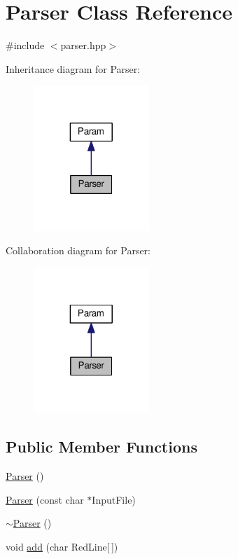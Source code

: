 \hypertarget{classParser}{\section{Parser Class Reference}
\label{classParser}
}


{\ttfamily \#include $<$parser.\-hpp$>$}



Inheritance diagram for Parser\-:
\nopagebreak
\begin{figure}[H]
\begin{center}
\leavevmode
\includegraphics[width=124pt]{classParser__inherit__graph}
\end{center}
\end{figure}


Collaboration diagram for Parser\-:
\nopagebreak
\begin{figure}[H]
\begin{center}
\leavevmode
\includegraphics[width=124pt]{classParser__coll__graph}
\end{center}
\end{figure}
\subsection*{Public Member Functions}
\begin{DoxyCompactItemize}
\item 
\hyperlink{classParser_a12234f6cd36b61af4b50c94a179422c1}{Parser} ()
\item 
\hyperlink{classParser_ae3012c947e9d131330b5cf510ba8bc2c}{Parser} (const char $\ast$Input\-File)
\item 
\hyperlink{classParser_a3e658b5917a93a3ef648050d060e3a93}{$\sim$\-Parser} ()
\item 
void \hyperlink{classParser_ae7099218e09ec122508491630f5f6ca0}{add} (char Red\-Line\mbox{[}$\,$\mbox{]})
\end{DoxyCompactItemize}
